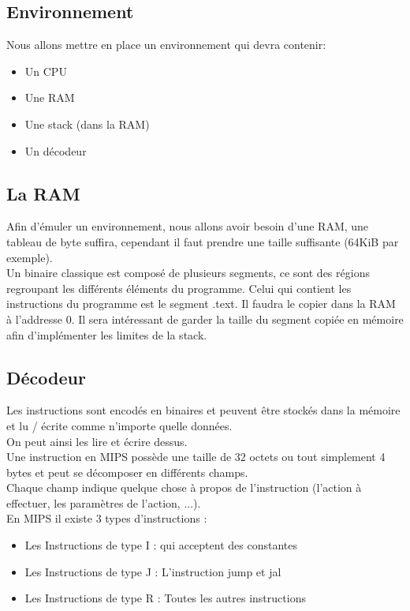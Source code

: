 \subsection{Environnement}

Nous allons mettre en place un environnement qui devra contenir:
\begin{itemize}
\item Un CPU 
\item Une RAM
\item Une stack (dans la RAM)
\item Un décodeur
\end{itemize}

\subsection{La RAM} Afin d'émuler un environnement, nous allons avoir besoin
d'une RAM, une tableau de byte suffira, cependant il faut prendre une taille
suffisante (64KiB par exemple).\\ Un binaire classique est composé de plusieurs
segments, ce sont des régions regroupant les différents éléments du programme.
Celui qui contient les instructions du programme est le segment .text. Il faudra
le copier dans la RAM à l'addresse 0. Il sera intéressant de garder la taille du
segment copiée en mémoire afin d'implémenter les limites de la stack.

\subsection{Décodeur} Les instructions sont encodés en binaires et peuvent être
stockés dans la mémoire et lu / écrite comme n'importe quelle données.\\ On peut
ainsi les lire et écrire dessus.\\

Une instruction en MIPS possède une taille de 32 octets ou tout simplement 4
bytes et peut se décomposer en différents champs.\\ Chaque champ indique quelque
chose à propos de l'instruction (l'action à effectuer, les paramètres de
l'action, ...).\\

En MIPS il existe 3 types d'instructions :
\begin{itemize}
  \item Les Instructions de type I : qui acceptent des constantes
  \item Les Instructions de type J : L'instruction jump et jal
  \item Les Instructions de type R : Toutes les autres instructions
\end{itemize}

